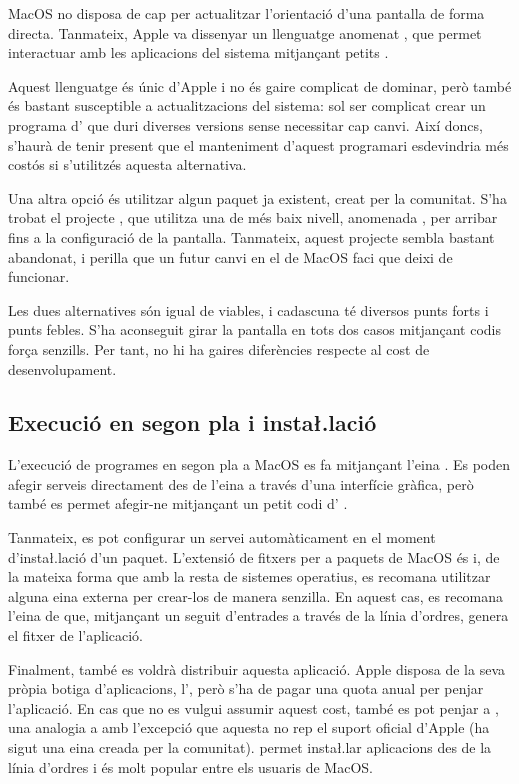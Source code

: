 MacOS no disposa de cap  per actualitzar l'orientació
d'una pantalla de forma directa. Tanmateix, Apple va dissenyar un llenguatge anomenat
, que permet interactuar amb les aplicacions del sistema
mitjançant petits  \cite{AppleScript}.

Aquest llenguatge és únic d'Apple i no és gaire complicat de dominar, però
també és bastant susceptible a actualitzacions del sistema: sol ser complicat
crear un programa d' que duri diverses versions sense
necessitar cap canvi. Així doncs, s'haurà de tenir present que el manteniment
d'aquest programari esdevindria més costós si s'utilitzés aquesta alternativa.

Una altra opció és utilitzar algun paquet ja existent, creat per la comunitat.
S'ha trobat el projecte  \cite{FBRotate}, que utilitza una
 de més baix nivell, anomenada , per arribar fins a
la configuració de la pantalla. Tanmateix, aquest projecte sembla bastant
abandonat, i perilla que un futur canvi en el  de MacOS faci que
deixi de funcionar.

Les dues alternatives són igual de viables, i cadascuna té diversos punts
forts i punts febles. S'ha aconseguit girar la pantalla en tots dos casos mitjançant
codis força senzills. Per tant, no hi ha gaires diferències respecte al cost
de desenvolupament.

\subsection{Execució en segon pla i insta\l.lació}

L'execució de programes en segon pla a MacOS es fa mitjançant l'eina
. Es poden afegir serveis directament des de l'eina 
a través d'una interfície gràfica, però també es permet afegir-ne mitjançant un
petit codi d' \cite{AppleService}.

Tanmateix, es pot configurar un servei automàticament en el moment
d'insta\l.lació d'un paquet. L'extensió de fitxers per a paquets de MacOS és
 i, de la mateixa forma que amb la resta de sistemes operatius,
es recomana utilitzar alguna eina externa per crear-los de manera senzilla.
En aquest cas, es recomana l'eina de \cite{ApplePackage} que, mitjançant un
seguit d'entrades a través de la línia d'ordres, genera el fitxer 
de l'aplicació.

Finalment, també es voldrà distribuir aquesta aplicació. Apple disposa de la
seva pròpia botiga d'aplicacions, l', però s'ha de pagar una
quota anual per penjar l'aplicació. En cas que no es vulgui assumir
aquest cost, també es pot penjar a , una
analogia a  amb l'excepció que aquesta no rep el suport oficial
d'Apple (ha sigut una eina creada per la comunitat).  permet
insta\l.lar aplicacions des de la línia d'ordres i és molt popular
entre els usuaris de MacOS.

